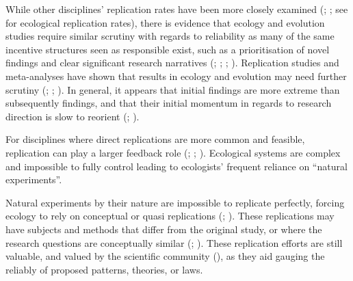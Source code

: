 \documentclass[10pt,a4paper]{article}
\begin{document}
While other disciplines' replication rates have been more closely examined (; ; see  for ecological replication rates), there is evidence that ecology and evolution studies require similar scrutiny with regards to reliability as many of the same incentive structures seen as responsible exist, such as a prioritisation of novel findings and clear significant research narratives (; ; ; ).
Replication studies and meta-analyses have shown that results in ecology and evolution may need further scrutiny (; ; ).
In general, it appears that initial findings are more extreme than subsequently findings, and that their initial momentum in regards to research direction is slow to reorient (; ).

For disciplines where direct replications are more common and feasible, replication can play a larger feedback role (; ; ).
Ecological systems are complex and impossible to fully control leading to ecologists' frequent reliance on ``natural experiments''.

Natural experiments by their nature are impossible to replicate perfectly, forcing ecology to rely on conceptual or quasi replications (; ).
These replications may have subjects and methods that differ from the original study, or where the research questions are conceptually similar (; ).
These replication efforts are still valuable, and valued by the scientific community (), as they aid gauging the reliably of proposed patterns, theories, or laws.
\end{document}

